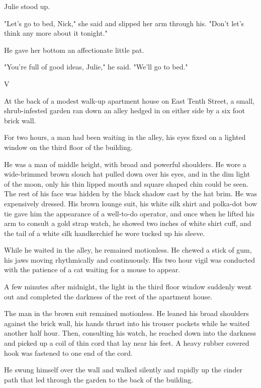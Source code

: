 \documentclass{novel}
\begin{document}
Julie stood up.

"Let's go to bed, Nick," she said and slipped her arm through his. "Don't let's think any more about it tonight."

He gave her bottom an affectionate little pat.

"You're full of good ideas, Julie," he said. "We'll go to bed."



V

At the back of a modest walk-up apartment house on East Tenth Street, a small, shrub-infested garden ran down an alley hedged in on either side by a six foot brick wall.

For two hours, a man had been waiting in the alley, his eyes fixed on a lighted window on the third floor of the building.

He was a man of middle height, with broad and powerful shoulders. He wore a wide-brimmed brown slouch hat pulled down over his eyes, and in the dim light of the moon, only his thin lipped mouth and square shaped chin could be seen. The rest of his face was hidden by the black shadow cast by the hat brim. He was expensively dressed. His brown lounge suit, his white silk shirt and polka-dot bow tie gave him the appearance of a well-to-do operator, and once when he lifted his arm to consult a gold strap watch, he showed two inches of white shirt cuff, and the tail of a white silk handkerchief he wore tucked up his sleeve.

While he waited in the alley, he remained motionless. He chewed a stick of gum, his jaws moving rhythmically and continuously. His two hour vigil was conducted with the patience of a cat waiting for a mouse to appear.

A few minutes after midnight, the light in the third floor window suddenly went out and completed the darkness of the rest of the apartment house.

The man in the brown suit remained motionless. He leaned his broad shoulders against the brick wall, his hands thrust into his trouser pockets while he waited another half hour. Then, consulting his watch, he reached down into the darkness and picked up a coil of thin cord that lay near his feet. A heavy rubber covered hook was fastened to one end of the cord.

He swung himself over the wall and walked silently and rapidly up the cinder path that led through the garden to the back of the building.
\end{document}
